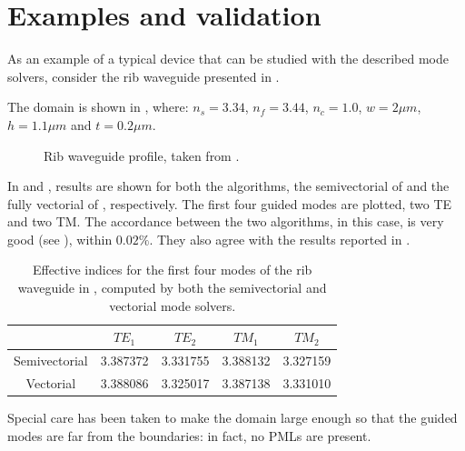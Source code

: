 
\section{Examples and validation}

As an example of a typical device that can be studied with the described
mode solvers, consider the rib waveguide presented in \cite{lohmeyer_wmm}.

The domain is shown in , where: $n_s = 3.34$, $n_f =
3.44$, $n_c = 1.0$, $w = 2 \mu m$, $h = 1.1 \mu m$ and $t = 0.2 \mu m$.

\begin{figure}[htbp]
  \begin{center}
    \resizebox{4cm}{!}{}
  \end{center}
  \caption{Rib waveguide profile, taken from \cite{lohmeyer_wmm}.}
  \label{fig:rib}
\end{figure}

In  and , results are
shown for both the algorithms, the semivectorial of
 and the fully vectorial of
, respectively. The first four
guided modes are plotted, two TE and two TM. The accordance between
the two algorithms, in this case, is very good (see
), within $0.02\%$. They also agree with the results
reported in \cite{lohmeyer_wmm}.

\begin{table}[htbp]
  \begin{center}
    \begin{tabular}{*{5}{c}}
      \hline
      & $TE_1$ & $TE_2$ & $TM_1$ & $TM_2$ \\
      \hline
      Semivectorial & 3.387372 & 3.331755 & 3.388132 & 3.327159 \\
      Vectorial & 3.388086 & 3.325017 & 3.387138 & 3.331010 \\
      \hline
    \end{tabular}
  \end{center}
  \caption{Effective indices for the first four modes of the rib
    waveguide in , computed by both the semivectorial
    and vectorial mode solvers.}
  \label{tab:wmm1}
\end{table}

Special care has been taken to make the domain large enough so that
the guided modes are far from the boundaries: in fact, no PMLs are
present.

